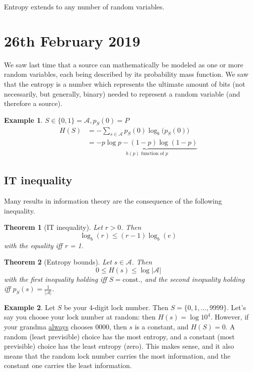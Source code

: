 \documentclass{article}
\theoremstyle{plain}
\newtheorem{thm}{Theorem}
\theoremstyle{definition}
\newtheorem{exmp}{Example}
\theoremstyle{remark}
\begin{document}
Entropy extends to any number of random variables.


\section{26th February 2019}
We saw last time that a source can mathematically be modeled as one or more random variables, each being described by its probability mass function. We saw that the entropy is a number which represents the ultimate amount of bits (not necessarily, but generally, binary) needed to represent a random variable (and therefore a source).
\begin{exmp}
$ S \in \{0, 1\} = \mathcal A, p_S(0) = P$
\begin{align*}
	H(S) &= - \sum_{s \in \mathcal A} p_S(0) \log_b \bigl(p_S(0)\bigr) \\
	&= \underbrace{-p \log p - (1-p) \log(1-p)}_{h(p) \text{ function of $p$}}
\end{align*}
\end{exmp}

\subsection{IT inequality}
Many results in information theory are the consequence of the following inequality.
\begin{thm}[IT inequality]
Let $r > 0$. Then
\begin{equation}
	\log_b(r) \leq (r-1) \log_b (e) %
\end{equation}
with the equality iff r = 1.
\end{thm}

\begin{thm}[Entropy bounds]
Let $s \in \mathcal A$. Then
\begin{equation}
	0 \leq H(s) \leq \log|\mathcal A|
\end{equation}
with the first inequality holding iff $S=\text{const.}$, and the second inequality holding iff $p_S(s)=\frac{1}{|\mathcal A|}$.
\end{thm}

\begin{exmp}
	Let $S$ be your 4-digit lock number. Then $S = \{0, 1, \ldots, 9999\}$. Let's say you choose your lock number at random: then $H(s) = \log 10^4$. However, if your grandma \ul{always} chooses $0000$, then $s$ is a constant, and $H(S) = 0$. A random (least previsible) choice has the most entropy, and a constant (most previsible) choice has the least entropy (zero). This makes sense, and it also means that the random lock number carries the most information, and the constant one carries the least information.
\end{exmp}
\end{document}

